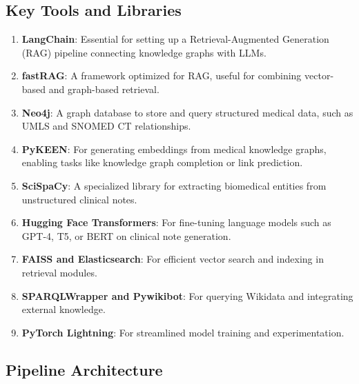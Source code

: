 \documentclass[12pt, a4paper]{article}
\begin{document}
\subsection{Key Tools and Libraries}

\begin{enumerate}
    \item \textbf{LangChain}: Essential for setting up a Retrieval-Augmented Generation (RAG) pipeline connecting knowledge graphs with LLMs.
    \item \textbf{fastRAG}: A framework optimized for RAG, useful for combining vector-based and graph-based retrieval.
    \item \textbf{Neo4j}: A graph database to store and query structured medical data, such as UMLS and SNOMED CT relationships.
    \item \textbf{PyKEEN}: For generating embeddings from medical knowledge graphs, enabling tasks like knowledge graph completion or link prediction.
    \item \textbf{SciSpaCy}: A specialized library for extracting biomedical entities from unstructured clinical notes.
    \item \textbf{Hugging Face Transformers}: For fine-tuning language models such as GPT-4, T5, or BERT on clinical note generation.
    \item \textbf{FAISS and Elasticsearch}: For efficient vector search and indexing in retrieval modules.
    \item \textbf{SPARQLWrapper and Pywikibot}: For querying Wikidata and integrating external knowledge.
    \item \textbf{PyTorch Lightning}: For streamlined model training and experimentation.
\end{enumerate}

\subsection{Pipeline Architecture}
\end{document}

